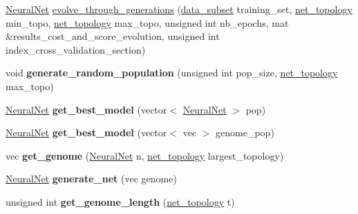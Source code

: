 \begin{DoxyCompactItemize}
\item 
\hyperlink{classNeuralNet}{Neural\-Net} \hyperlink{classEvolutionary__trainer_aee8c215b6f8cea925138f736f35413e8}{evolve\-\_\-through\-\_\-generations} (\hyperlink{structdata__subset}{data\-\_\-subset} training\-\_\-set, \hyperlink{structnet__topology}{net\-\_\-topology} min\-\_\-topo, \hyperlink{structnet__topology}{net\-\_\-topology} max\-\_\-topo, unsigned int nb\-\_\-epochs, mat \&results\-\_\-cost\-\_\-and\-\_\-score\-\_\-evolution, unsigned int index\-\_\-cross\-\_\-validation\-\_\-section)
\item 
\hypertarget{classEvolutionary__trainer_a46fd9af5bb456a2cbc4621f5a0f6d3e5}{void {\bfseries generate\-\_\-random\-\_\-population} (unsigned int pop\-\_\-size, \hyperlink{structnet__topology}{net\-\_\-topology} max\-\_\-topo)}\label{classEvolutionary__trainer_a46fd9af5bb456a2cbc4621f5a0f6d3e5}

\item 
\hypertarget{classEvolutionary__trainer_af99a07cfacf9ba82026ea175eb9a58e8}{\hyperlink{classNeuralNet}{Neural\-Net} {\bfseries get\-\_\-best\-\_\-model} (vector$<$ \hyperlink{classNeuralNet}{Neural\-Net} $>$ pop)}\label{classEvolutionary__trainer_af99a07cfacf9ba82026ea175eb9a58e8}

\item 
\hypertarget{classEvolutionary__trainer_a592e3ac8186cb753aa6657d10071b21b}{\hyperlink{classNeuralNet}{Neural\-Net} {\bfseries get\-\_\-best\-\_\-model} (vector$<$ vec $>$ genome\-\_\-pop)}\label{classEvolutionary__trainer_a592e3ac8186cb753aa6657d10071b21b}

\item 
\hypertarget{classEvolutionary__trainer_a0165542480e5b3209d7566ced1079960}{vec {\bfseries get\-\_\-genome} (\hyperlink{classNeuralNet}{Neural\-Net} n, \hyperlink{structnet__topology}{net\-\_\-topology} largest\-\_\-topology)}\label{classEvolutionary__trainer_a0165542480e5b3209d7566ced1079960}

\item 
\hypertarget{classEvolutionary__trainer_a0d49a904e77b9bb62c43bdf643b1d508}{\hyperlink{classNeuralNet}{Neural\-Net} {\bfseries generate\-\_\-net} (vec genome)}\label{classEvolutionary__trainer_a0d49a904e77b9bb62c43bdf643b1d508}

\item 
\hypertarget{classEvolutionary__trainer_a7c4e15cd59c8f37c0483625a94a2fb75}{unsigned int {\bfseries get\-\_\-genome\-\_\-length} (\hyperlink{structnet__topology}{net\-\_\-topology} t)}\label{classEvolutionary__trainer_a7c4e15cd59c8f37c0483625a94a2fb75}


\end{DoxyCompactItemize}
